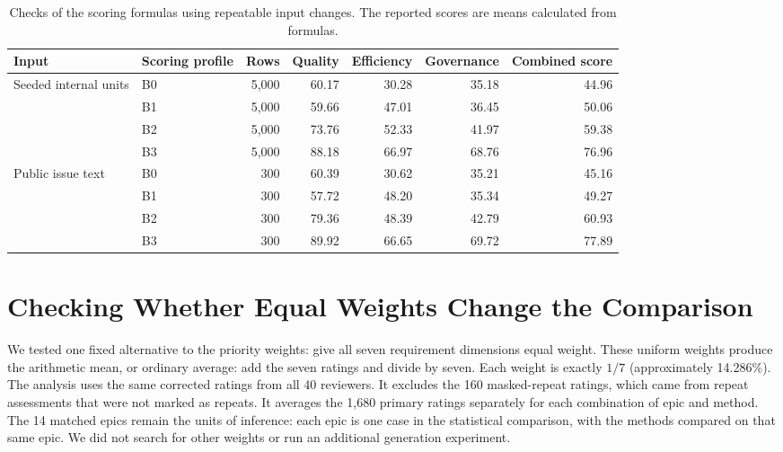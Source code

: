 \documentclass[10pt,a4paper]{article}
\begin{document}
\begin{table}[htbp]
\centering
\setlength{\tabcolsep}{3pt}
\small
\caption{Checks of the scoring formulas using repeatable input changes. The reported scores are means calculated from formulas.}
\label{tab:scoring-sanity-checks}
\begin{tabular}{@{}llrrrrr@{}}
\toprule
Input & Scoring profile & Rows & Quality & Efficiency & Governance & Combined score \\
\midrule
Seeded internal units & B0 & 5,000 & 60.17 & 30.28 & 35.18 & 44.96 \\
 & B1 & 5,000 & 59.66 & 47.01 & 36.45 & 50.06 \\
 & B2 & 5,000 & 73.76 & 52.33 & 41.97 & 59.38 \\
 & B3 & 5,000 & 88.18 & 66.97 & 68.76 & 76.96 \\
\midrule
Public issue text & B0 & 300 & 60.39 & 30.62 & 35.21 & 45.16 \\
 & B1 & 300 & 57.72 & 48.20 & 35.34 & 49.27 \\
 & B2 & 300 & 79.36 & 48.39 & 42.79 & 60.93 \\
 & B3 & 300 & 89.92 & 66.65 & 69.72 & 77.89 \\
\bottomrule
\end{tabular}
\end{table}




\clearpage
\section{Checking Whether Equal Weights Change the Comparison}\label{sec:weight-sensitivity}
We tested one fixed alternative to the priority weights: give all seven requirement dimensions equal weight. These uniform weights produce the arithmetic mean, or ordinary average: add the seven ratings and divide by seven. Each weight is exactly $1/7$ (approximately 14.286\%). The analysis uses the same corrected ratings from all 40 reviewers. It excludes the 160 masked-repeat ratings, which came from repeat assessments that were not marked as repeats. It averages the 1,680 primary ratings separately for each combination of epic and method. The 14 matched epics remain the units of inference: each epic is one case in the statistical comparison, with the methods compared on that same epic. We did not search for other weights or run an additional generation experiment.
\end{document}
